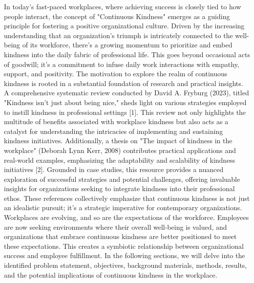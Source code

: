 \documentclass[a4paper, 11pt]{report}
\begin{document}
In today's fast-paced workplaces, where achieving success is closely tied to how people interact, the concept of "Continuous Kindness" emerges as a guiding principle for fostering a positive organizational culture. Driven by the increasing understanding that an organization's triumph is intricately connected to the well-being of its workforce, there's a growing momentum to prioritize and embed kindness into the daily fabric of professional life. This goes beyond occasional acts of goodwill; it's a commitment to infuse daily work interactions with empathy, support, and positivity.
\vspace{5mm} %
\newline
The motivation to explore the realm of continuous kindness is rooted in a substantial foundation of research and practical insights. A comprehensive systematic review conducted by David A. Fryburg (2023), titled "Kindness isn't just about being nice," sheds light on various strategies employed to instill kindness in professional settings [1]. This review not only highlights the multitude of benefits associated with workplace kindness but also acts as a catalyst for understanding the intricacies of implementing and sustaining kindness initiatives.
\vspace{5mm} %
\newline
Additionally, a thesis on "The impact of kindness in the workplace" (Deborah Lynn Kerr, 2008) contributes practical applications and real-world examples, emphasizing the adaptability and scalability of kindness initiatives [2]. Grounded in case studies, this resource provides a nuanced exploration of successful strategies and potential challenges, offering invaluable insights for organizations seeking to integrate kindness into their professional ethos.
\vspace{5mm} %
\newline
These references collectively emphasize that continuous kindness is not just an idealistic pursuit; it's a strategic imperative for contemporary organizations. Workplaces are evolving, and so are the expectations of the workforce. Employees are now seeking environments where their overall well-being is valued, and organizations that embrace continuous kindness are better positioned to meet these expectations. This creates a symbiotic relationship between organizational success and employee fulfillment. In the following sections, we will delve into the identified problem statement, objectives, background materials, methods, results, and the potential implications of continuous kindness in the workplace.
\end{document}
